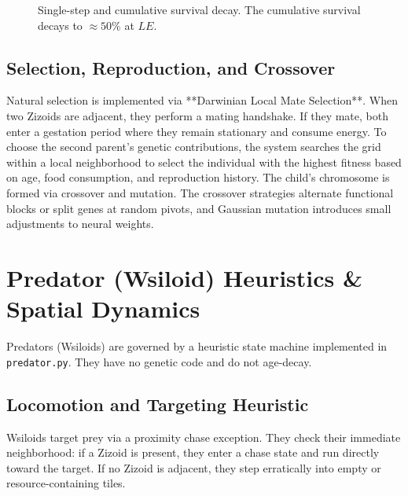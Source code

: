 \documentclass[11pt,a4paper]{article}
\begin{document}
\begin{figure}[h]
\centering
{}
\caption{Single-step and cumulative survival decay. The cumulative survival decays to $\approx 50\%$ at $LE$.}
\label{fig:survival}
\end{figure}

\subsection{Selection, Reproduction, and Crossover}
Natural selection is implemented via **Darwinian Local Mate Selection**. When two Zizoids are adjacent, they perform a mating handshake. If they mate, both enter a gestation period where they remain stationary and consume energy. To choose the second parent's genetic contributions, the system searches the grid within a local neighborhood to select the individual with the highest fitness based on age, food consumption, and reproduction history. The child's chromosome is formed via crossover and mutation. The crossover strategies alternate functional blocks or split genes at random pivots, and Gaussian mutation introduces small adjustments to neural weights.

\section{Predator (Wsiloid) Heuristics \& Spatial Dynamics}

Predators (Wsiloids) are governed by a heuristic state machine implemented in \texttt{predator.py}. They have no genetic code and do not age-decay.

\subsection{Locomotion and Targeting Heuristic}
Wsiloids target prey via a proximity chase exception. They check their immediate neighborhood: if a Zizoid is present, they enter a chase state and run directly toward the target. If no Zizoid is adjacent, they step erratically into empty or resource-containing tiles.
\end{document}
